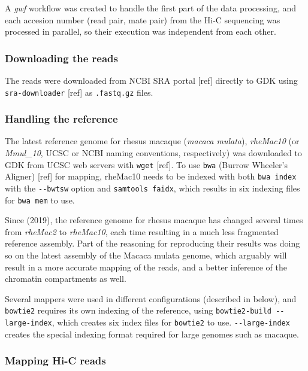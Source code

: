 \documentclass[
  11pt,
  a4paper,
]{scrbook}
\let\oldemph\emph
\renewcommand\emph[1]{\oldemph{\color{gray}#1}}
\begin{document}
A \emph{gwf} workflow was created to handle the first part of the data
processing, and each accesion number (read pair, mate pair) from the
Hi-C sequencing was processed in parallel, so their execution was
independent from each other.

\subsubsection{Downloading the reads}\label{downloading-the-reads}

The reads were downloaded from NCBI SRA portal {[}ref{]} directly to GDK
using \texttt{sra-downloader} {[}ref{]} as \texttt{.fastq.gz} files.

\subsubsection{Handling the reference}\label{handling-the-reference}

The latest reference genome for rhesus macaque (\emph{macaca mulata}),
\emph{rheMac10} (or \emph{Mmul\_10}, UCSC or NCBI naming conventions,
respectively) was downloaded to GDK from UCSC web servers with
\texttt{wget} {[}ref{]}. To use \texttt{bwa} (Burrow Wheeler's Aligner)
{[}ref{]} for mapping, rheMac10 needs to be indexed with both
\texttt{bwa\ index} with the \texttt{-\/-bwtsw} option and
\texttt{samtools\ faidx}, which results in six indexing files for
\texttt{bwa\ mem} to use.

Since (2019), the reference genome for rhesus macaque has changed
several times from \emph{rheMac2} to \emph{rheMac10}, each time
resulting in a much less fragmented reference assembly. Part of the
reasoning for reproducing their results was doing so on the latest
assembly of the Macaca mulata genome, which arguably will result in a
more accurate mapping of the reads, and a better inference of the
chromatin compartments as well.

Several mappers were used in different configurations (described in
below), and \texttt{bowtie2} requires its own indexing of the reference,
using \texttt{bowtie2-build\ -\/-large-index}, which creates six index
files for \texttt{bowtie2} to use. \texttt{-\/-large-index} creates the
special indexing format required for large genomes such as macaque.

\subsubsection{Mapping Hi-C reads}\label{mapping-hi-c-reads}
\end{document}
